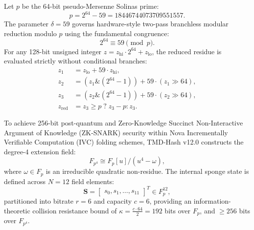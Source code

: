 \documentclass[11pt,a4paper,reqno]{article}
\def\mathbb#1{#1}%
\theoremstyle{plain}
\theoremstyle{definition}
\theoremstyle{remark}
\numberwithin{equation}{section}
\begin{document}
Let $p$ be the 64-bit pseudo-Mersenne Solinas prime:
\begin{equation}
\label{eq:solinas_prime}
p = 2^{64} - 59 = 18446744073709551557.
\end{equation}
The parameter $\delta = 59$ governs hardware-style two-pass branchless modular reduction modulo $p$ using the fundamental congruence:
\begin{equation}
\label{eq:solinas_identity}
2^{64} \equiv 59 \pmod{p}.
\end{equation}
For any 128-bit unsigned integer $z = z_{\text{hi}} \cdot 2^{64} + z_{\text{lo}}$, the reduced residue is evaluated strictly without conditional branches:
\begin{equation}
\label{eq:solinas_reduction}
\begin{aligned}
z_1 &= z_{\text{lo}} + 59 \cdot z_{\text{hi}}, \\
z_2 &= (z_1 \mathbin{\&} (2^{64}-1)) + 59 \cdot (z_1 \gg 64), \\
z_3 &= (z_2 \mathbin{\&} (2^{64}-1)) + 59 \cdot (z_2 \gg 64), \\
z_{\text{red}} &= z_3 \ge p \; ? \; z_3 - p : z_3.
\end{aligned}
\end{equation}

To achieve 256-bit post-quantum and Zero-Knowledge Succinct Non-Interactive Argument of Knowledge (ZK-SNARK) security within Nova Incrementally Verifiable Computation (IVC) folding schemes, TMD-Hash v12.0 constructs the degree-4 extension field:
\begin{equation}
\label{eq:quartic_field}
\mathbb{F}_{p^4} \cong \mathbb{F}_p[u] / (u^4 - \omega),
\end{equation}
where $\omega \in \mathbb{F}_p$ is an irreducible quadratic non-residue. The internal sponge state is defined across $N = 12$ field elements:
\begin{equation}
\label{eq:state_vector}
\mathbf{S} = \begin{bmatrix} s_0, s_1, \dots, s_{11} \end{bmatrix}^T \in \mathbb{F}_p^{12},
\end{equation}
partitioned into bitrate $r = 6$ and capacity $c = 6$, providing an information-theoretic collision resistance bound of $\kappa = \frac{c \cdot 64}{2} = 192$ bits over $\mathbb{F}_p$, and $\ge 256$ bits over $\mathbb{F}_{p^4}$.
\end{document}
